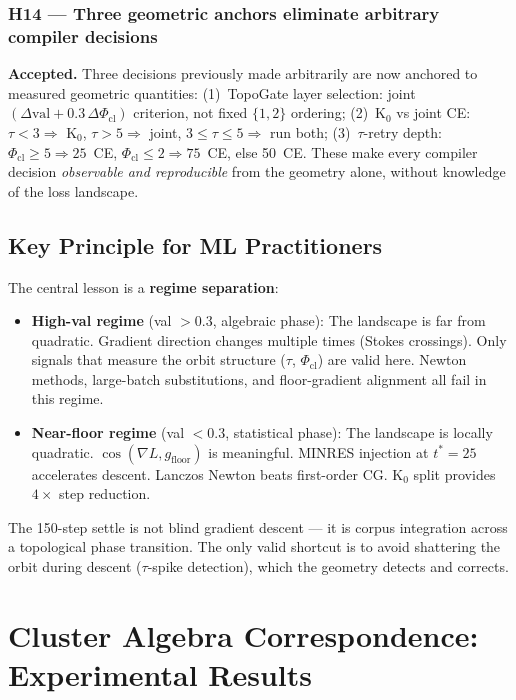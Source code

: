 \documentclass[11pt]{amsart}
\begin{document}
\subsubsection*{H14 — Three geometric anchors eliminate arbitrary compiler decisions}

\textbf{Accepted.}
Three decisions previously made arbitrarily are now anchored to
measured geometric quantities:
(1)~TopoGate layer selection: joint $(\Delta\mathrm{val} + 0.3\,\Delta\Phi_\mathrm{cl})$
criterion, not fixed $\{1,2\}$ ordering;
(2)~K$_0$ vs joint CE: $\tau < 3 \Rightarrow$ K$_0$,
$\tau > 5 \Rightarrow$ joint, $3 \leq \tau \leq 5 \Rightarrow$ run both;
(3)~$\tau$-retry depth: $\Phi_\mathrm{cl} \geq 5 \Rightarrow 25$~CE,
$\Phi_\mathrm{cl} \leq 2 \Rightarrow 75$~CE, else 50~CE.
These make every compiler decision \emph{observable and reproducible}
from the geometry alone, without knowledge of the loss landscape.

\subsection{Key Principle for ML Practitioners}

The central lesson is a \textbf{regime separation}:
\begin{itemize}
\item \textbf{High-val regime} (val $> 0.3$, algebraic phase):
  The landscape is far from quadratic.
  Gradient direction changes multiple times (Stokes crossings).
  Only signals that measure the orbit structure ($\tau$, $\Phi_\mathrm{cl}$)
  are valid here.
  Newton methods, large-batch substitutions, and floor-gradient alignment
  all fail in this regime.
\item \textbf{Near-floor regime} (val $< 0.3$, statistical phase):
  The landscape is locally quadratic.
  $\cos(\nabla L, g_\mathrm{floor})$ is meaningful.
  MINRES injection at $t^* = 25$ accelerates descent.
  Lanczos Newton beats first-order CG.
  K$_0$ split provides $4\times$ step reduction.
\end{itemize}
The 150-step settle is not blind gradient descent —
it is corpus integration across a topological phase transition.
The only valid shortcut is to avoid shattering the orbit during descent
($\tau$-spike detection), which the geometry detects and corrects.

\section{Cluster Algebra Correspondence: Experimental Results}
\label{sec:cluster_correspondence}
\end{document}
